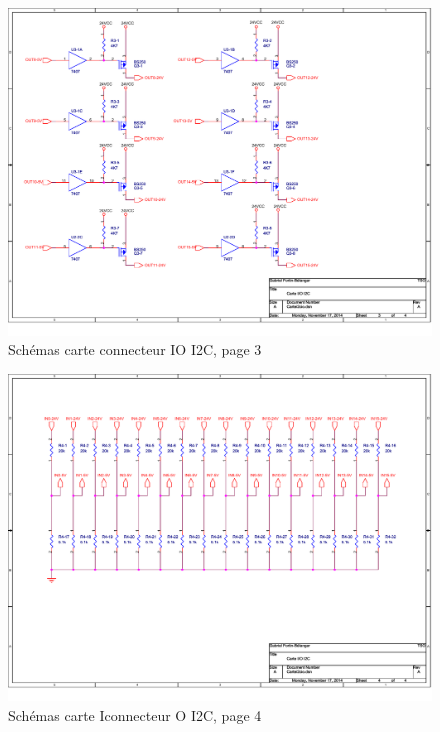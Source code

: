 \begin{figure}[hbtp]
\caption{Schémas carte connecteur IO I2C, page 3}
\centering
\includegraphics[scale=0.87,angle=90]{Figures/OrCad/PAGE3.pdf}
\end{figure}

\begin{figure}[hbtp]
\caption{Schémas carte Iconnecteur O I2C, page 4}
\centering
\includegraphics[scale=0.87,angle=90]{Figures/OrCad/PAGE4.pdf}
\end{figure}

\vfill
\pagebreak


